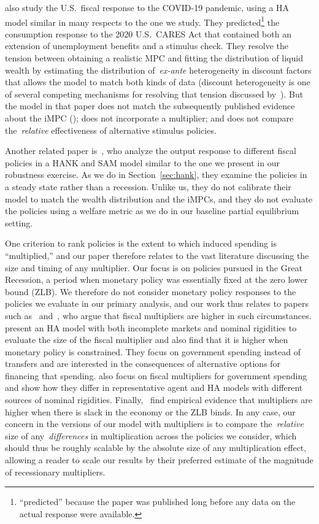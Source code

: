 \documentclass[\latexroot/\projectname]{subfiles}
\begin{document}
\cite{carroll2020modeling} also study the U.S.\ fiscal response to the COVID-19 pandemic, using a HA model similar in many respects to the one we study.  They predicted\footnote{``predicted'' because the paper was published long before any data on the actual response were available.} the consumption response to the 2020 U.S.\ CARES Act  that contained both an extension of unemployment benefits and a stimulus check.
They resolve the tension between obtaining a realistic MPC and fitting the distribution of liquid wealth by estimating the distribution of~\textit{ex-ante} heterogeneity in discount factors that allows the model to match both kinds of data (discount heterogeneity is one of several competing mechanisms for resolving that tension discussed by~\cite{kaplanMPC2022}).
But the model in that paper does not match the subsequently published evidence about the iMPC (\cite{fagereng-mpc-2021}); does not incorporate a multiplier; and does not compare the~\textit{relative} effectiveness of alternative stimulus policies.

Another related paper is~\cite{broer2025stimulus}, who analyze the output response to different fiscal policies in a HANK and SAM model similar to the one we present in our robustness exercise. As we do in Section~\ref{sec:hank}, they examine the policies in a steady state rather than a recession. Unlike us, they do not calibrate their model to match the wealth distribution and the iMPCs, and they do not evaluate the policies using a welfare metric as we do in our baseline partial equilibrium setting.

One criterion to rank policies is the extent to which induced spending is ``multiplied,'' and our paper therefore relates to the vast literature discussing the size and timing of any multiplier.
Our focus is on policies pursued in the Great Recession, a period when monetary policy was essentially fixed at the zero lower bound (ZLB).
We therefore do not consider monetary policy responses to the policies we evaluate in our primary analysis, and our work thus relates to papers such as~\cite{christiano2011government} and~\cite{eggertsson2011fiscal}, who argue that fiscal multipliers are higher in such circumstances.
\cite{hagedorn2019fiscal} present an HA model with both incomplete markets and nominal rigidities to evaluate the size of the fiscal multiplier and also find that it is higher when monetary policy is constrained.  They focus on government spending instead of transfers and are interested in the consequences of alternative options for financing that spending.
\cite{broer2023fiscalmultipliers} also focus on fiscal multipliers for government spending and show how they differ in representative agent and HA models with different sources of nominal rigidities.
Finally,~\cite{ramey2018government} find empirical evidence that multipliers are higher when there is slack in the economy or the ZLB binds.  
In any case, our concern in the versions of our model with multipliers is to compare the~\textit{relative} size of any~\textit{differences} in multiplication across the policies we consider, which should thus be roughly scalable by the absolute size of any multiplication effect, allowing a reader to scale our results by their preferred estimate of the magnitude of recessionary multipliers.
\end{document}
